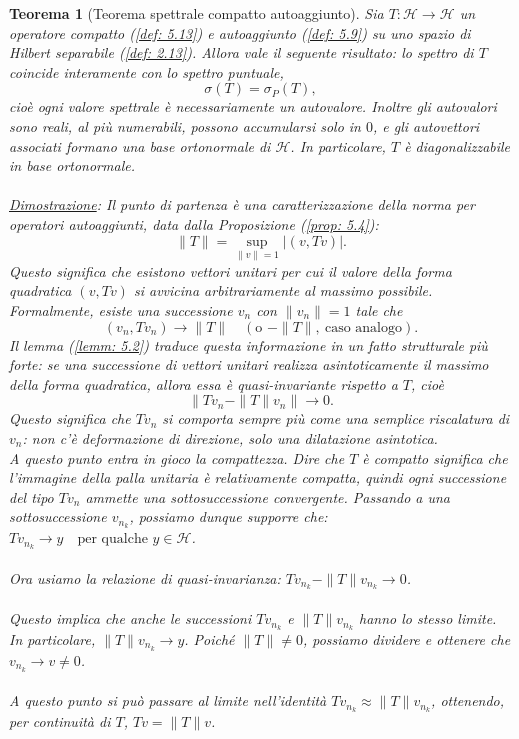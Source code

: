 \documentclass[a4paper,12pt]{report}
\newtheorem{teorema}{Teorema}[chapter]
\begin{document}
\begin{teorema}[Teorema spettrale compatto autoaggiunto]
    Sia $T:\mathscr H\to\mathscr H$ un operatore compatto (\ref{def: 5.13}) e autoaggiunto (\ref{def: 5.9}) su uno spazio di Hilbert separabile (\ref{def: 2.13}). Allora vale il seguente risultato: lo spettro di $T$ coincide interamente con lo spettro puntuale,
\[
\sigma(T)=\sigma_P(T),
\]
cioè ogni valore spettrale è necessariamente un autovalore. Inoltre gli autovalori sono reali, al più numerabili, possono accumularsi solo in $0$, e gli autovettori associati formano una base ortonormale di $\mathscr H$. In particolare, $T$ è diagonalizzabile in base ortonormale.
\\
\\\underline{Dimostrazione}: Il punto di partenza è una caratterizzazione della norma per operatori autoaggiunti, data dalla Proposizione (\ref{prop: 5.4}):
\[
\|T\|=\sup_{\|v\|=1}|(v,Tv)|.
\]
Questo significa che esistono vettori unitari per cui il valore della forma quadratica $(v,Tv)$ si avvicina arbitrariamente al massimo possibile. Formalmente, esiste una successione $v_n$ con $\|v_n\|=1$ tale che
\[
(v_n,Tv_n)\to \|T\|
\quad (\text{o } -\|T\|,\ \text{caso analogo}).
\]
Il lemma (\ref{lemm: 5.2}) traduce questa informazione in un fatto strutturale più forte: se una successione di vettori unitari realizza asintoticamente il massimo della forma quadratica, allora essa è quasi-invariante rispetto a $T$, cioè
\[
\|Tv_n-\|T\|v_n\|\to 0.
\]
Questo significa che $Tv_n$ si comporta sempre più come una semplice riscalatura di $v_n$: non c’è deformazione di direzione, solo una dilatazione asintotica.
\\A questo punto entra in gioco la compattezza. Dire che $T$ è compatto significa che l’immagine della palla unitaria è relativamente compatta, quindi ogni successione del tipo $Tv_n$ ammette una sottosuccessione convergente. Passando a una sottosuccessione $v_{n_k}$, possiamo dunque supporre che: $Tv_{n_k}\to y
\quad \text{per qualche } y\in\mathscr H$.
\\
\\Ora usiamo la relazione di quasi-invarianza: $Tv_{n_k}-\|T\|v_{n_k}\to 0$.
\\
\\Questo implica che anche le successioni $Tv_{n_k}$ e $\|T\|v_{n_k}$ hanno lo stesso limite. In particolare, $\|T\|v_{n_k}\to y$. Poiché $\|T\|\neq 0$, possiamo dividere e ottenere che $v_{n_k}\to v\neq 0$.
\\
\\A questo punto si può passare al limite nell’identità $Tv_{n_k}\approx \|T\|v_{n_k}$, ottenendo, per continuità di $T$, $Tv=\|T\|v$.

\end{teorema}
\end{document}
